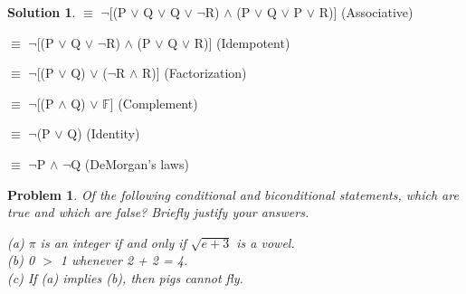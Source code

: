 \documentclass{article}
\newtheorem{problem}{Problem}
\theoremstyle{definition}
\newtheorem*{solution}{Solution}
\begin{document}
\begin{solution}
\(\equiv\) \(\neg\)[(P \(\vee\) Q \(\vee\) Q \(\vee\) \(\neg\)R) \(\wedge\) (P \(\vee\) Q \(\vee\) P \(\vee\) R)] (Associative)

\(\equiv\) \(\neg\)[(P \(\vee\) Q \(\vee\) \(\neg\)R) \(\wedge\) (P \(\vee\) Q \(\vee\) R)] (Idempotent)

\(\equiv\) \(\neg\)[(P \(\vee\) Q) \(\vee\) (\(\neg\)R \(\wedge\) R)] (Factorization)

\(\equiv\) \(\neg\)[(P \(\wedge\) Q) \(\vee\) \(\mathbb{F}\)] (Complement)

\(\equiv\) \(\neg\)(P \(\vee\) Q) (Identity)

\(\equiv\) \(\neg\)P \(\wedge\) \(\neg\)Q (DeMorgan's laws)

\end{solution}

\break

\begin{problem}
Of the following conditional and biconditional statements, which are true and which are false? Briefly justify your answers.

(a) \(\pi\) is an integer if and only if \(\sqrt{e+3}\) is a vowel.\\

(b) 0 $>$ 1 whenever 2 + 2 = 4.\\

(c) If (a) implies (b), then pigs cannot fly.\\\\
\end{problem}
\end{document}
